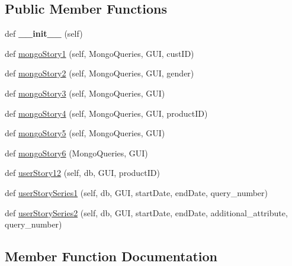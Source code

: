 \subsection*{Public Member Functions}
\begin{DoxyCompactItemize}
\item 
\hypertarget{class_all_user_stories_1_1_all_user_stories_a2ae1139002bd6e26a335a57cc2fb6f13}{}\label{class_all_user_stories_1_1_all_user_stories_a2ae1139002bd6e26a335a57cc2fb6f13} 
def {\bfseries \+\_\+\+\_\+init\+\_\+\+\_\+} (self)
\item 
def \hyperlink{class_all_user_stories_1_1_all_user_stories_a70125234edcc5315e8473d9928d85c80}{mongo\+Story1} (self, Mongo\+Queries, G\+UI, cust\+ID)
\item 
def \hyperlink{class_all_user_stories_1_1_all_user_stories_a749505378bf81816d48d6f72553379d1}{mongo\+Story2} (self, Mongo\+Queries, G\+UI, gender)
\item 
def \hyperlink{class_all_user_stories_1_1_all_user_stories_a89b5e3cfc51a5cf4f8299b3c0695824d}{mongo\+Story3} (self, Mongo\+Queries, G\+UI)
\item 
def \hyperlink{class_all_user_stories_1_1_all_user_stories_a1c32ef2b5c7cdac1fe9e6695b77f798f}{mongo\+Story4} (self, Mongo\+Queries, G\+UI, product\+ID)
\item 
def \hyperlink{class_all_user_stories_1_1_all_user_stories_acf328e4938ec594a351ae762464507ad}{mongo\+Story5} (self, Mongo\+Queries, G\+UI)
\item 
def \hyperlink{class_all_user_stories_1_1_all_user_stories_a28910ecdf86a20ec3e21acbc600cfb4f}{mongo\+Story6} (Mongo\+Queries, G\+UI)
\item 
def \hyperlink{class_all_user_stories_1_1_all_user_stories_afce2cf693ebf64cf3e056995968ffe29}{user\+Story12} (self, db, G\+UI, product\+ID)
\item 
def \hyperlink{class_all_user_stories_1_1_all_user_stories_ad0f925eabb44f073abfa723cf10205e7}{user\+Story\+Series1} (self, db, G\+UI, start\+Date, end\+Date, query\+\_\+number)
\item 
def \hyperlink{class_all_user_stories_1_1_all_user_stories_a3652c394b2fcdead6261d92c22109f53}{user\+Story\+Series2} (self, db, G\+UI, start\+Date, end\+Date, additional\+\_\+attribute, query\+\_\+number)
\end{DoxyCompactItemize}


\subsection{Member Function Documentation}
\hypertarget{class_all_user_stories_1_1_all_user_stories_a70125234edcc5315e8473d9928d85c80}{}\label{class_all_user_stories_1_1_all_user_stories_a70125234edcc5315e8473d9928d85c80} 
